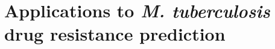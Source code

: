 \chapter{Applications to \textit{M. tuberculosis} drug resistance prediction}
\label{chap:dst}
\ifpdf
    \graphicspath{{Chapter3/Figs/Raster/}{Chapter3/Figs/PDF/}{Chapter3/Figs/}}
\else
    \graphicspath{{Chapter3/Figs/Vector/}{Chapter3/Figs/}}
\fi


